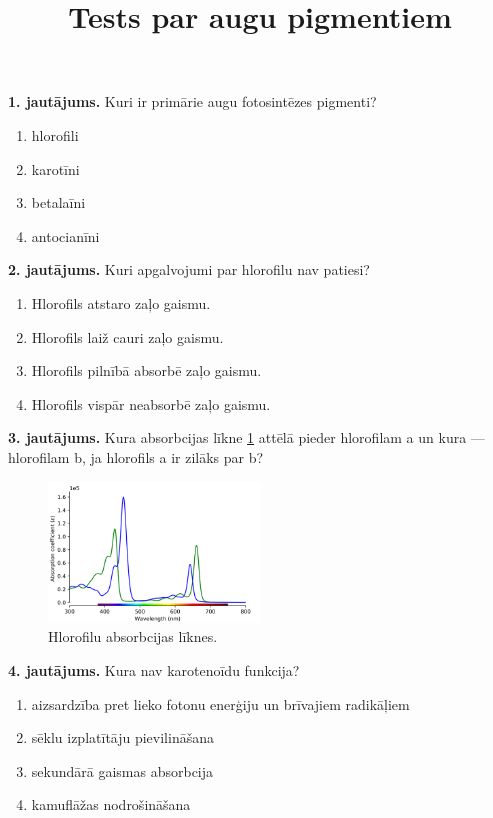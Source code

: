 \documentclass[12pt,a4paper]{article}
\title{\textbf{Tests par augu pigmentiem}}
\author{}
\date{}
\begin{document}
\maketitle


\noindent \textbf{1. jautājums.} Kuri ir primārie augu fotosintēzes pigmenti? 
\begin{enumerate}[label=\Alph*.]
    \item hlorofili
    \item karotīni
    \item betalaīni
    \item antocianīni
\end{enumerate}
\noindent \textbf{2. jautājums.} Kuri apgalvojumi par hlorofilu nav patiesi?

\begin{enumerate}[label=\Alph*.]
    \item Hlorofils atstaro zaļo gaismu.
    \item Hlorofils laiž cauri zaļo gaismu.
    \item Hlorofils pilnībā absorbē zaļo gaismu.
    \item Hlorofils vispār neabsorbē zaļo gaismu.
\end{enumerate}

\noindent \textbf{3. jautājums.} Kura absorbcijas līkne \ref{fig:hlorofili} attēlā pieder hlorofilam a un kura — hlorofilam b, ja hlorofils a ir zilāks par b?
\begin{figure}[H]
    \centering
    \includegraphics[width=0.5\textwidth]{atteli/hlorofili.png}
    \caption{Hlorofilu absorbcijas līknes.}
    \label{fig:hlorofili}
\end{figure}

\newpage

\noindent \textbf{4. jautājums.} Kura nav karotenoīdu funkcija? 

\begin{enumerate}[label=\Alph*.]
    \item aizsardzība pret lieko fotonu enerģiju un brīvajiem radikāļiem
    \item sēklu izplatītāju pievilināšana
    \item sekundārā gaismas absorbcija
    \item kamuflāžas nodrošināšana
\end{enumerate}
\end{document}
